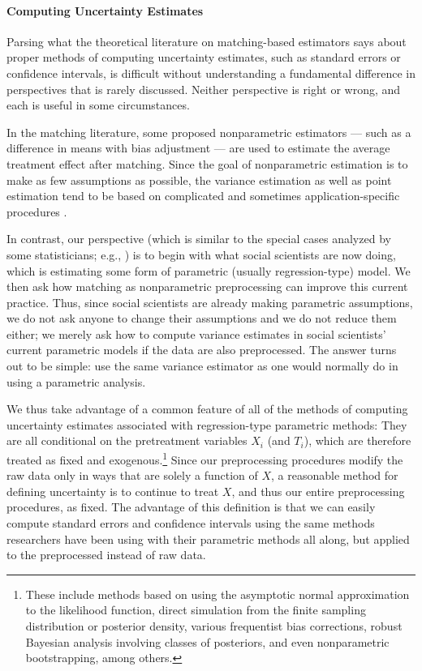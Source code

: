 \documentclass[11pt,titlepage]{article}
\begin{document}
\paragraph{Computing Uncertainty Estimates}

Parsing what the theoretical literature on matching-based estimators
says about proper methods of computing uncertainty estimates, such as
standard errors or confidence intervals, is difficult without
understanding a fundamental difference in perspectives that is rarely
discussed.  Neither perspective is right or wrong, and each is useful
in some circumstances.  

In the matching literature, some proposed nonparametric estimators ---
such as a difference in means with bias adjustment --- are used to
estimate the average treatment effect after matching.  Since the goal
of nonparametric estimation is to make as few assumptions as possible,
the variance estimation as well as point estimation tend to be based
on complicated and sometimes application-specific procedures
\citep[e.g.,][]{AbaImb05}.

In contrast, our perspective (which is similar to the special cases
analyzed by some statisticians; e.g., \citealt{RubTho00}) is to begin
with what social scientists are now doing, which is estimating some
form of parametric (usually regression-type) model.  We then ask how
matching as nonparametric preprocessing can improve this current
practice.  Thus, since social scientists are already making
parametric assumptions, we do not ask anyone to change their
assumptions and we do not reduce them either; we merely ask how to
compute variance estimates in social scientists' current parametric
models if the data are also preprocessed.  The answer turns out to be
simple: use the same variance estimator as one would normally do in
using a parametric analysis.

We thus take advantage of a common feature of all of the methods of
computing uncertainty estimates associated with regression-type
parametric methods: They are all conditional on the pretreatment
variables $X_i$ (and $T_i$), which are therefore treated as fixed and
exogenous.\footnote{These include methods based on using the
  asymptotic normal approximation to the likelihood function, direct
  simulation from the finite sampling distribution or posterior
  density, various frequentist bias corrections, robust Bayesian
  analysis involving classes of posteriors, and even nonparametric
  bootstrapping, among others.}  Since our preprocessing procedures
modify the raw data only in ways that are solely a function of $X$, a
reasonable method for defining uncertainty is to continue to treat
$X$, and thus our entire preprocessing procedures, as fixed.  The
advantage of this definition is that we can easily compute standard
errors and confidence intervals using the same methods researchers
have been using with their parametric methods all along, but applied
to the preprocessed instead of raw data.
\end{document}
